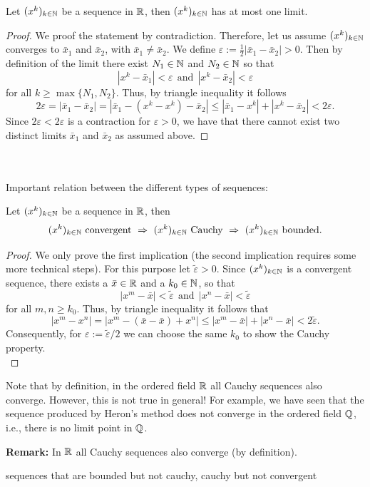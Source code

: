 \begin{frame} 
\begin{theo}
	Let $(x^k)_{k\in {\mathbb{N}}}$ be a sequence in ${\mathbb{R}}$, then $(x^k)_{k\in {\mathbb{N}}}$ has at most one limit.
\end{theo}
\begin{proof} \blank
	We proof the statement by contradiction. Therefore, let us assume $(x^k)_{k\in {\mathbb{N}}}$ converges to $\bar{x}_1$ and $\bar{x}_2$, with $\bar{x}_1\neq \bar{x}_2$. We define $\varepsilon := \frac{1}{2}|\bar{x}_1- \bar{x}_2|>0$. Then by definition of the limit there exist $N_1\in{\mathbb{N}}$ and $N_2\in{\mathbb{N}}$ so that
	$$|x^k-\bar{x}_1| <  \varepsilon~~\text{and}~~|x^k-\bar{x}_2| <  \varepsilon$$
	for all $k \geq \max\{N_1,N_2\}$. Thus, by triangle inequality it follows
	$$2\varepsilon= |\bar{x}_1- \bar{x}_2| =  |\bar{x}_1- (x^k-x^k) -\bar{x}_2| \leq |\bar{x}_1-  x^k|+|x^k- \bar{x}_2| < 2\varepsilon.$$
	Since $2\varepsilon< 2\varepsilon$ is a contraction for $\varepsilon>0$, we have that there cannot exist two distinct limits $\bar{x}_1$ and $\bar{x}_2$ as assumed above.
\end{proof}
~\\~\\
Important relation between the different types of sequences:
\begin{theo}\label{theo:relation_conv_cauchy_bound}
	Let $(x^k)_{k\in {\mathbb{N}}}$ be a sequence in ${\mathbb{R}}$, then 
	$$(x^k)_{k\in {\mathbb{N}}}~\text{convergent}~\Rightarrow~(x^k)_{k\in {\mathbb{N}}}~\text{Cauchy}~\Rightarrow~(x^k)_{k\in {\mathbb{N}}}~\text{bounded}.$$
\end{theo}\vspace{0.4cm}
\begin{proof}\blank
	We only prove the first implication (the second implication requires some more technical steps). For this purpose let $\tilde{\varepsilon} > 0$. Since $(x^k)_{k\in {\mathbb{N}}}$ is a convergent sequence, there exists a $\bar{x}\in {\mathbb{R}}$ and a $k_0 \in {\mathbb{N}}$, so that
	$$|x^m-\bar{x}| <  \tilde{\varepsilon} ~~\text{and}~~|x^n-\bar{x}| <  \tilde{\varepsilon}$$
	for all $m,n \geq k_0$. Thus, by triangle inequality it follows that
	$$|x^m-x^n| = |x^m-(\bar{x}-\bar{x})+x^n| \leq |x^m-\bar{x}| + |x^n-\bar{x}| < 2\tilde{\varepsilon}.$$ Consequently, for $\varepsilon:= {\tilde{\varepsilon}}/{2}$ we can choose the same $k_0$ to show the Cauchy property.\\
\end{proof} 
\begin{re}
	Note that by definition, in the ordered field ${\mathbb{R}}$ all Cauchy sequences also converge. However, this is not true in general! For example, we have seen that the sequence produced by Heron's method does not converge in the ordered field ${\mathbb{Q}}$, i.e., there is no limit point in ${\mathbb{Q}}$.
\end{re}
\textbf{Remark:} In ${\mathbb{R}}$ all Cauchy sequences also converge (by definition).
\vspace{2.4cm}
\begin{ex}
	\blank
	sequences that are bounded but not cauchy, cauchy but not convergent
\end{ex}
 \end{frame}


